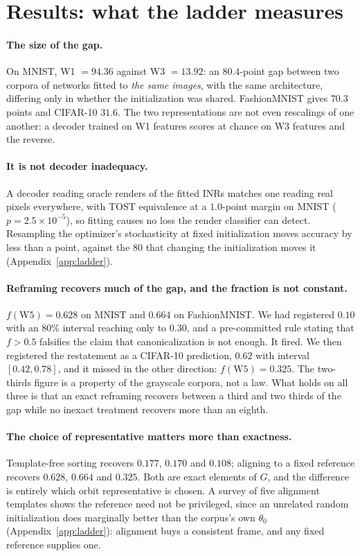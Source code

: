\section{Results: what the ladder measures}\label{sec:results}

\paragraph{The size of the gap.} On MNIST, W1 $=94.36$ against W3 $=13.92$: an $80.4$-point gap
between two corpora of networks fitted to \emph{the same images}, with the same architecture,
differing only in whether the initialization was shared. FashionMNIST gives $70.3$ points and
CIFAR-10 $31.6$. The two representations are not even rescalings of one another: a decoder trained
on W1 features scores at chance on W3 features and the reverse.

\paragraph{It is not decoder inadequacy.} A decoder reading oracle renders of the fitted INRs
matches one reading real pixels everywhere, with TOST equivalence at a $1.0$-point margin on MNIST
($p = 2.5\times10^{-5}$), so fitting causes no loss the render classifier can detect. Resampling the optimizer's stochasticity at
fixed initialization moves accuracy by less than a point, against the $80$ that changing the
initialization moves it (Appendix~\ref{app:ladder}).

\paragraph{Reframing recovers much of the gap, and the fraction is not constant.}
$f(\mathrm{W5}) = 0.628$ on MNIST and $0.664$ on FashionMNIST. We had registered $0.10$ with an
$80\%$ interval reaching only to $0.30$, and a pre-committed rule stating that $f > 0.5$ falsifies
the claim that canonicalization is not enough. It fired. We then registered the restatement as a
CIFAR-10 prediction, $0.62$ with interval $[0.42,0.78]$, and it missed in the other direction:
$f(\mathrm{W5}) = 0.325$. The two-thirds figure is a property of the grayscale corpora, not a law.
What holds on all three is that an exact reframing recovers between a third and two thirds of the
gap while no inexact treatment recovers more than an eighth.

\paragraph{The choice of representative matters more than exactness.} Template-free sorting
recovers $0.177$, $0.170$ and $0.108$; aligning to a fixed reference recovers $0.628$, $0.664$ and
$0.325$. Both are exact elements of $G$, and the difference is entirely which orbit representative
is chosen. A survey of five alignment templates shows the reference need not be privileged, since an
unrelated random initialization does marginally better than the corpus's own $\theta_0$
(Appendix~\ref{app:ladder}): alignment buys a consistent frame, and any fixed reference supplies
one.


